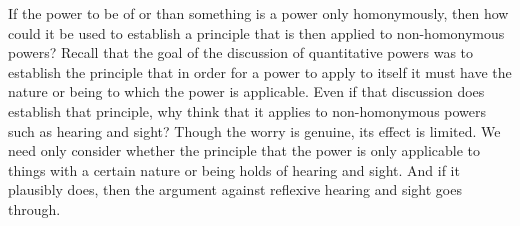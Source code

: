 If the power to be of or than something is a power only homonymously, then how could it be used to establish a principle that is then applied to non-homo\-nym\-ous powers? Recall that the goal of the discussion of quantitative powers was to establish the principle that in order for a power to apply to itself it must have the nature or being to which the power is applicable. Even if that discussion does establish that principle, why think that it applies to non-homonymous powers such as hearing and sight? Though the worry is genuine, its effect is limited. We need only consider whether the principle that the power is only applicable to things with a certain nature or being holds of hearing and sight. And if it plausibly does, then the argument against reflexive hearing and sight goes through.

%
%

